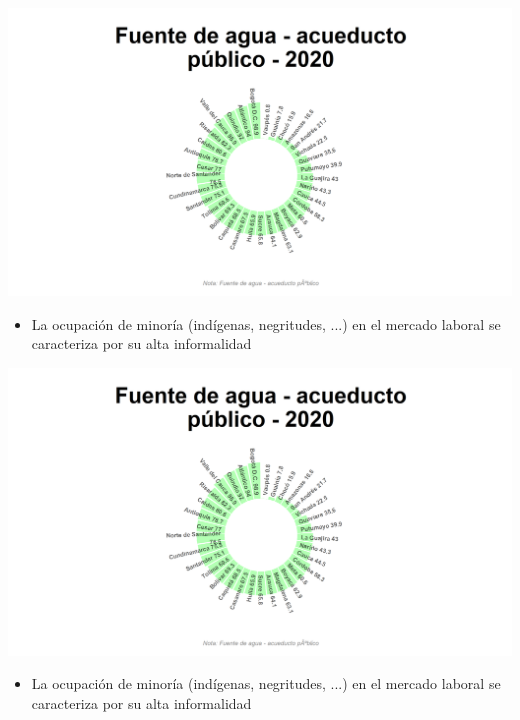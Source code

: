 \documentclass[aspectratio=169]{beamer}
\begin{document}
    \begin{slide}{15} 
            \begin{imagecolumn}
                \includegraphics[width=\columnwidth]{img/var_129_static.png}
            \end{imagecolumn}
            \begin{textcolumn}
                \begin{itemize}
                    \item La ocupación de minoría (indígenas, negritudes, ...) en el mercado laboral se caracteriza por su alta informalidad
                \end{itemize}
            \end{textcolumn}
    \printcolumns
    \end{slide}
    
    
    \begin{slide}{15} 
            \begin{imagecolumn}
                \includegraphics[width=\columnwidth]{img/var_129_static.png}
            \end{imagecolumn}
            \begin{textcolumn}
                \begin{itemize}
                    \item La ocupación de minoría (indígenas, negritudes, ...) en el mercado laboral se caracteriza por su alta informalidad
                \end{itemize}
            \end{textcolumn}
    \printcolumns
    \end{slide}
    
\end{document}
